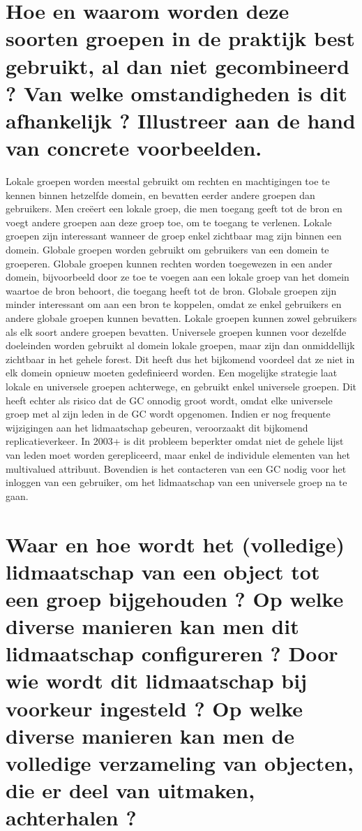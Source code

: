 
\clearpage
\section{Hoe en waarom worden deze soorten groepen in de praktijk best gebruikt, al dan niet gecombineerd ? Van welke omstandigheden is dit afhankelijk ? Illustreer aan de hand van concrete voorbeelden.}

Lokale groepen worden meestal gebruikt om rechten en machtigingen toe te kennen binnen hetzelfde domein, en bevatten eerder andere groepen dan gebruikers. Men creëert een lokale groep, die men toegang geeft tot de bron en voegt andere groepen aan deze groep toe, om te toegang te verlenen. Lokale groepen zijn interessant wanneer de groep enkel zichtbaar mag zijn binnen een domein.
\npar
Globale groepen worden gebruikt om gebruikers van een domein te groeperen. Globale groepen kunnen rechten worden toegewezen in een ander domein, bijvoorbeeld door ze toe te voegen aan een lokale groep van het domein waartoe de bron behoort, die toegang heeft tot de bron. Globale groepen zijn minder interessant om aan een bron te koppelen, omdat ze enkel gebruikers en andere globale groepen kunnen bevatten. Lokale groepen kunnen zowel gebruikers als elk soort andere groepen bevatten.
\npar
Universele groepen kunnen voor dezelfde doeleinden worden gebruikt al domein lokale groepen, maar zijn dan onmiddellijk zichtbaar in het gehele forest. Dit heeft dus het bijkomend voordeel dat ze niet in elk domein opnieuw moeten gedefinieerd worden. Een mogelijke strategie laat lokale en universele groepen achterwege, en gebruikt enkel universele groepen. Dit heeft echter als risico dat de GC onnodig groot wordt, omdat elke universele groep met al zijn leden in de GC wordt opgenomen. Indien er nog frequente wijzigingen aan het lidmaatschap gebeuren, veroorzaakt dit bijkomend replicatieverkeer. In 2003+ is dit probleem beperkter omdat niet de gehele lijst van leden moet worden gerepliceerd, maar enkel de individule elementen van het multivalued attribuut. Bovendien is het contacteren van een GC nodig voor het inloggen van een gebruiker, om het lidmaatschap van een universele groep na te gaan.

\section{Waar en hoe wordt het (volledige) lidmaatschap van een object tot een groep bijgehouden ? Op welke diverse manieren kan men dit lidmaatschap configureren ? Door wie wordt dit lidmaatschap bij voorkeur ingesteld ? Op welke diverse manieren kan men de volledige verzameling van objecten, die er deel van uitmaken, achterhalen ?}

